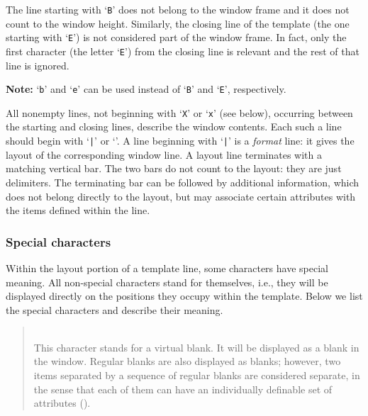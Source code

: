 The line starting with `{\tt B}' does not belong to the window frame and
it does not count to the window height.
Similarly, the closing line of the template (the one starting with `{\tt E}')
is not considered part of the window frame.
In fact, only the first character (the letter `{\tt E}') from the closing
line is relevant and the rest of that line is ignored.

\medskip

\noindent
{\bf Note:} `{\tt b}' and `{\tt e}' can be used instead of `{\tt B}' and
`{\tt E}', respectively.

\medskip

All nonempty lines, not beginning with `{\tt X}' or `{\tt x}' (see below),
occurring between the
starting and closing lines, describe the window contents.
Each such a line should begin with `{\tt |}' or `{\tt *}'.
A line beginning with `{\tt |}' is a {\em format\/} line: it gives the
layout of the corresponding window line.
A layout line terminates with a matching vertical bar.
The two bars do not count to the layout: they are just delimiters.
The terminating bar can be followed by additional information, which does
not belong directly to the layout, but may associate certain attributes
with the items defined within the line.

\subsubsection{Special characters}
\label{rm_ds_tp_sc}

Within the layout portion of a template line, some characters have special
meaning.
All non-special characters stand for themselves, i.e.,
they will be displayed directly on the positions they occupy within the
template.
Below we list the special characters and describe their meaning.

\medskip

\begin{quote}
\noindent{}\\ \hspace{0in}
This character stands for a virtual blank.
It will be displayed as a blank in the window.
Regular blanks are also displayed as blanks; however, two items separated
by a sequence of regular blanks are considered separate, in the sense that
each of them can have an individually definable set of attributes
().
\end{quote}

